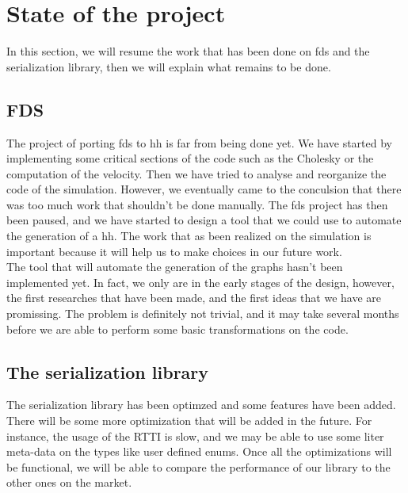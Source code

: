 
\section{State of the project}

In this section, we will resume the work that has been done on \gls{fds} and the
serialization library, then we will explain what remains to be done.

\subsection{FDS}

The project of porting \gls{fds} to \gls{hh} is far from being done yet. We have
started by implementing some critical sections of the code such as the Cholesky
or the computation of the velocity. Then we have tried to analyse and reorganize
the code of the simulation. However, we eventually came to the conculsion that
there was too much work that shouldn't be done manually. The \gls{fds} project
has then been paused, and we have started to design a tool that we could use to
automate the generation of a \gls{hh}. The work that as been realized on the
simulation is important because it will help us to make choices in our future
work.\\

The tool that will automate the generation of the graphs hasn't been implemented
yet. In fact, we only are in the early stages of the design, however, the first
researches that have been made, and the first ideas that we have are promissing.
The problem is definitely not trivial, and it may take several months before we
are able to perform some basic transformations on the code.

\subsection{The serialization library}

The serialization library has been optimzed and some features have been added.
There will be some more optimization that will be added in the future. For
instance, the usage of the RTTI is slow, and we may be able to use some liter
meta-data on the types like user defined enums. Once all the optimizations will
be functional, we will be able to compare the performance of our library to the
other ones on the market.
